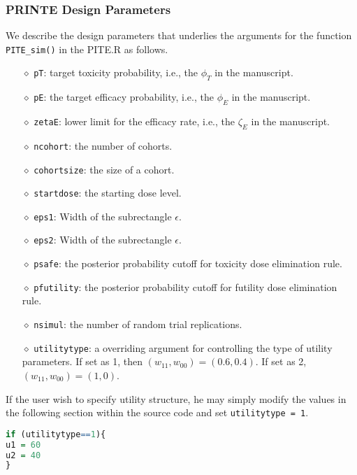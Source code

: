 \documentclass[notitlepage]{article}
\begin{document}
 \subsubsection{PRINTE Design Parameters}
 We describe the design parameters that underlies the arguments for the function \texttt{PITE\_sim()} in the  PITE.R as follows.
 \begin{itemize}
\item[$\diamond$] \texttt{pT}: target toxicity probability, i.e., the $\phi_T$ in the manuscript.
\item[$\diamond$] \texttt{pE}: the target  efficacy probability, i.e., the $\phi_E$ in the manuscript.
\item[$\diamond$] \texttt{zetaE}: lower limit for the efficacy rate, i.e., the $\zeta_E$ in the manuscript.
\item[$\diamond$] \texttt{ncohort}: the number of cohorts.
\item[$\diamond$] \texttt{cohortsize}: the size of a cohort.
\item[$\diamond$] \texttt{startdose}: the starting dose level.
\item[$\diamond$] \texttt{eps1}: Width of the subrectangle $\epsilon$.
\item[$\diamond$] \texttt{eps2}: Width of the subrectangle $\epsilon$.
\item[$\diamond$] \texttt{psafe}: the posterior probability cutoff for toxicity dose elimination rule.
\item[$\diamond$] \texttt{pfutility}: the posterior probability cutoff for futility dose elimination rule.
\item[$\diamond$] \texttt{nsimul}: the number of random trial replications.
\item[$\diamond$] \texttt{utilitytype}: a overriding argument for controlling the type of utility parameters. If set as 1, then $(w_{11},w_{00}) = (0.6,0.4)$. If set as 2, $(w_{11},w_{00}) = (1,0)$.
\end{itemize}
If the user wish to specify utility structure, he may simply modify the values in the following section within the source code and set \texttt{utilitytype = 1}.
\begin{lstlisting}[language=R]
if (utilitytype==1){
u1 = 60
u2 = 40
}
\end{lstlisting}
\end{document}
